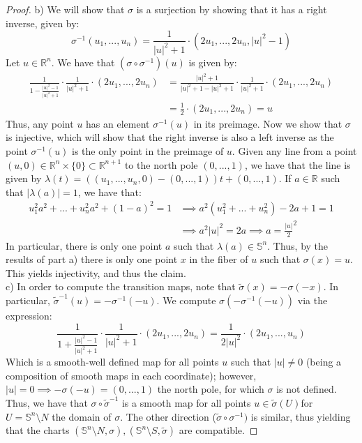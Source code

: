\documentclass{article}
\newcommand{\bb}[1]{\mathbb{#1}}
\begin{document}
\begin{proof}
 b) We will show that $\sigma$ is a surjection by showing that it has a right inverse, given by:
 \[
   \sigma^{-1}(u_{1},...,u_{n}) = \frac{1}{|u|^{2}+1}\cdot (2u_{1},...,2u_{n},|u|^{2}-1)
 \]
 Let $u \in \bb{R}^{n}$. We have that $(\sigma \circ \sigma^{-1})(u)$ is given by:
 \begin{align*}
   \frac{1}{1 - \frac{|u|^{2} - 1}{|u|^{2}+1}}\cdot \frac{1}{|u|^{2} + 1} \cdot (2u_{1},...,2u_{n})  &  = \frac{|u|^{2}+1}{|u|^{2}+1 - |u|^{2} + 1}\cdot \frac{1}{|u|^{2} + 1} \cdot (2u_{1},...,2u_{n}) \\
   & = \frac{1}{2} \cdot (2u_{1},...,2u_{n}) = u
 \end{align*}
 Thus, any point $u$ has an element $\sigma^{-1}(u)$ in its preimage. Now we show that $\sigma$ is injective, which will show that the right inverse is also a left inverse as the point $\sigma^{-1}(u)$ is the only point in the preimage of $u$. Given any line from a point $(u,0) \in \bb{R}^{n} \times \{0\} \subset \bb{R}^{n+1}$ to the north pole $(0,...,1)$, we have that the line is given by $\lambda(t) = ((u_{1},...,u_{n},0) - (0,...,1))t + (0,...,1)$. If $a \in \bb{R}$ such that $|\lambda(a)| = 1$, we have that:
 \begin{align*}
   u_{1}^{2}a^{2}+...+u_{n}^{2}a^{2} + (1 - a)^{2} = 1 & \implies a^{2}(u_{1}^{2}+...+u_{n}^{2}) - 2a + 1 = 1 \\
   & \implies a^{2}|u|^{2} = 2a \implies a = \frac{|u|}{2}^{2}
 \end{align*}
 In particular, there is only one point $a$ such that $\lambda(a) \in \bb{S}^{n}$. Thus, by the results of part a) there is only one point $x$ in the fiber of $u$ such that $\sigma(x) = u$. This yields injectivity, and thus the claim.\\

 c) In order to compute the transition maps, note that $\widetilde{\sigma}(x) = -\sigma(-x)$. In particular, $\widetilde{\sigma}^{-1}(u) = - \sigma^{-1}(-u)$. We compute $\sigma(-\sigma^{-1}(-u))$ via the expression:
\[
  \frac{1}{1 + \frac{|u|^{2} - 1}{|u|^{2}+1}}\cdot \frac{1}{|u|^{2} + 1} \cdot (2u_{1},...,2u_{n}) = \frac{1}{2|u|^{2}} \cdot (2u_{1},...,u_{n}) 
\]
Which is a smooth-well defined map for all points $u$ such that $|u| \neq 0$ (being a composition of smooth maps in each coordinate); however, $|u| = 0 \implies -\sigma(-u) = (0,...,1)$ the north pole, for which $\sigma$ is not defined. Thus, we have that $\sigma \circ \widetilde{\sigma}^{-1}$ is a smooth map for all points $u \in \widetilde{\sigma}(U)$for $U = \bb{S}^{n} \setminus N$ the domain of $\sigma$. The other direction ($\widetilde{\sigma} \circ \sigma^{-1})$ is similar, thus yielding that the charts $(\bb{S}^{n} \setminus N, \sigma), (\bb{S}^{n} \setminus S, \widetilde{\sigma})$ are compatible. 
\end{proof}
\end{document}
